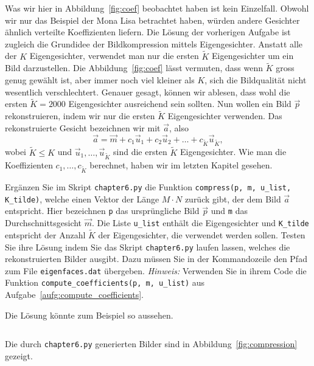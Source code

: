 Was wir hier in Abbildung~\ref{fig:coef} beobachtet haben ist kein Einzelfall.
Obwohl wir nur das Beispiel der Mona Lisa betrachtet haben, würden andere Gesichter ähnlich verteilte Koeffizienten liefern.
Die Lösung der vorherigen Aufgabe ist zugleich die Grundidee der Bildkompression mittels Eigengesichter.
Anstatt alle der $K$ Eigengesichter, verwendet man nur die ersten $\tilde K$ Eigengesichter um ein Bild darzustellen.
Die Abbildung~\ref{fig:coef} lässt vermuten, dass wenn $\tilde K$ gross genug gewählt ist, aber immer noch viel kleiner als $K$, sich die Bildqualität nicht wesentlich verschlechtert.
Genauer gesagt, können wir ablesen, dass wohl die ersten $\tilde K=2000$ Eigengesichter ausreichend sein sollten.
Nun wollen ein Bild $\vec p$ rekonstruieren, indem wir nur die ersten $\tilde K$ Eigengesichter verwenden.
Das rekonstruierte Gesicht bezeichnen wir mit $\vec a$, also
\begin{equation*}
	\vec a=\vec m+c_1\vec u_1+c_2\vec u_2+\ldots+c_{\tilde K}\vec u_{\tilde K},
\end{equation*}
wobei $\tilde K\leq K$ und $\vec u_1,\ldots,\vec u_{\tilde K}$ sind die ersten $\tilde K$ Eigengesichter.
Wie man die Koeffizienten $c_1,\ldots,c_{\tilde K}$ berechnet, haben wir im letzten Kapitel gesehen.
\begin{aufgabe} \label{aufg:compression}
	Ergänzen Sie im Skript \texttt{chapter6.py} die Funktion \texttt{compress(p, m, u\_list, K\_tilde)}, welche einen Vektor der Länge $M\cdot N$ zurück gibt, der dem Bild $\vec a$ entspricht.
	Hier bezeichnen \texttt{p} das ursprüngliche Bild $\vec p$ und \texttt{m} das Durchschnittsgesicht $\vec m$.
	Die Liste \texttt{u\_list} enthält die Eigengesichter und \texttt{K\_tilde} entspricht der Anzahl $\tilde K$ der Eigengesichter, die verwendet werden sollen.
	Testen Sie ihre Lösung indem Sie das Skript \texttt{chapter6.py} laufen lassen, welches die rekonstruierten Bilder ausgibt.
	Dazu müssen Sie in der Kommandozeile den Pfad zum File \texttt{eigenfaces.dat} übergeben.
	\textit{Hinweis:} Verwenden Sie in ihrem Code die Funktion \texttt{compute\_coefficients(p, m, u\_list)} aus Aufgabe~\ref{aufg:compute_coefficients}.
\end{aufgabe}
\begin{losung}
	Die Lösung könnte zum Beispiel so aussehen.
\inputminted[frame=single,framesep=5pt,firstline=5,lastline=12]{python}{codes/solution/chapter6.py}
Die durch \texttt{chapter6.py} generierten Bilder sind in Abbildung~\ref{fig:compression} gezeigt.
\end{losung}
